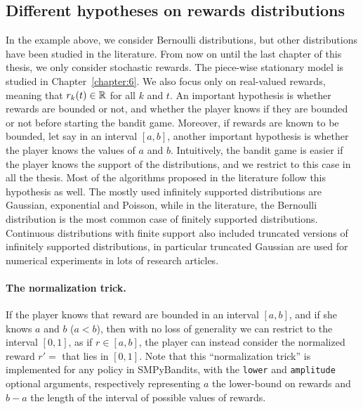 

\subsection{Different hypotheses on rewards distributions}

In the example above, we consider Bernoulli distributions, but other distributions have been studied in the literature.
From now on until the last chapter of this thesis, we only consider stochastic rewards. The piece-wise stationary model is studied in Chapter~\ref{chapter:6}.
%
We also focus only on real-valued rewards, meaning that $r_k(t)\in\mathbb{R}$ for all $k$ and $t$.
An important hypothesis is whether rewards are bounded or not,
and whether the player knows if they are bounded or not before starting the bandit game.
Moreover, if rewards are known to be bounded, let say in an interval $[a,b]$, another important hypothesis is whether the player knows the values of $a$ and $b$.
%
Intuitively, the bandit game is easier if the player knows the support of the distributions, and we restrict to this case in all the thesis.
Most of the algorithms proposed in the literature follow this hypothesis as well.
%
The mostly used
infinitely supported distributions are Gaussian, exponential and Poisson,
while in the literature, the Bernoulli distribution is the most common case of finitely supported distributions.
Continuous distributions with finite support also included truncated versions of infinitely supported distributions, in particular truncated Gaussian are used for numerical experiments in lots of research articles.

\paragraph{The normalization trick.}
%
If the player knows that reward are bounded in an interval $[a,b]$, and if she knows $a$ and $b$ ($a<b$), then with no loss of generality we can restrict to the interval $[0,1]$, as if $r\in[a,b]$, the player can instead consider the normalized reward $r' = $ that lies in $[0,1]$.
Note that this ``normalization trick'' is implemented for any policy in SMPyBandits, with the \texttt{lower} and \texttt{amplitude} optional arguments, respectively representing $a$ the lower-bound on rewards and $b-a$ the length of the interval of possible values of rewards.

